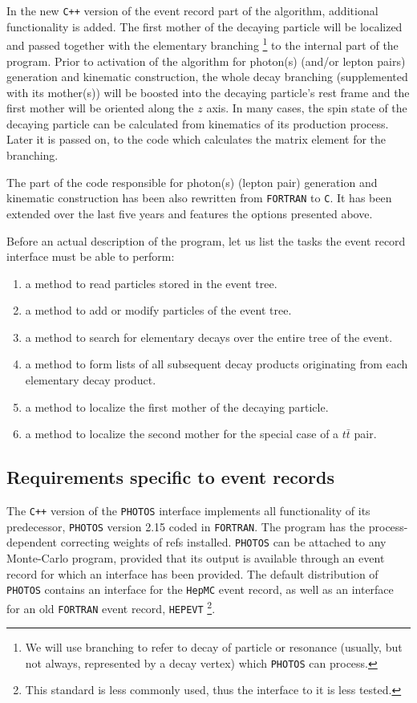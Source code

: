 \documentclass[]{Photos_interface_design}
\begin{document}
In the new {\tt C++} version of the event record part of the algorithm, additional functionality
is added.
The first mother of the decaying particle will be localized and passed together with  
the elementary branching%
\footnote{We will use branching to refer to decay of particle or resonance (usually, but not always, represented by a decay vertex) which {\tt PHOTOS} can process. }
 to the internal part of the program. 
Prior to activation of the algorithm for  photon(s) (and/or lepton pairs) generation and kinematic construction,
 the whole decay branching 
(supplemented with its mother(s))
will be boosted into the decaying particle's rest frame and the first mother
will be oriented along the $z$ axis. 
In many cases, the spin state of the decaying particle  can be calculated from kinematics of its production process.
Later it is passed on, to the code which calculates the matrix element for the branching.


The part of the code responsible for photon(s) (lepton pair) 
generation and kinematic 
construction has been also rewritten from {\tt FORTRAN} to {\tt C}. It has been extended
over the last five years and features the options presented above.


Before an actual description of the program, let us list the tasks the event record interface must be able to perform:
\begin{enumerate}
\item a method to read  particles stored in the event tree.
\item a method to add or modify particles of the event tree.
\item a method to search for elementary decays over the entire tree of the event.
\item a method to form lists of all subsequent decay products originating from each elementary decay product.
\item a method to localize the first mother of the decaying particle. 
\item a method to localize the second mother for the special case of a $t \bar t$ pair.
\end{enumerate}


\subsection{ Requirements specific to event records}

The {\tt C++} version of the {\tt PHOTOS} interface implements all functionality
of its predecessor, {\tt PHOTOS} version 2.15 \cite{Golonka:2005pn} coded in {\tt FORTRAN}.
The program has the process-dependent correcting weights of refs 
\cite{Golonka:2006tw,Nanava:2009vg} installed.
{\tt PHOTOS} can be attached to any Monte-Carlo program,
provided that its output is available through an event record for which an interface has been provided.
The default distribution of {\tt PHOTOS} contains an interface for the {\tt HepMC} \cite{Dobbs:2001ck} event record,
as well as an interface for an old {\tt FORTRAN} event record, {\tt HEPEVT}%
\footnote{This standard is less commonly used, thus the interface to it is less tested.}.
\end{document}
